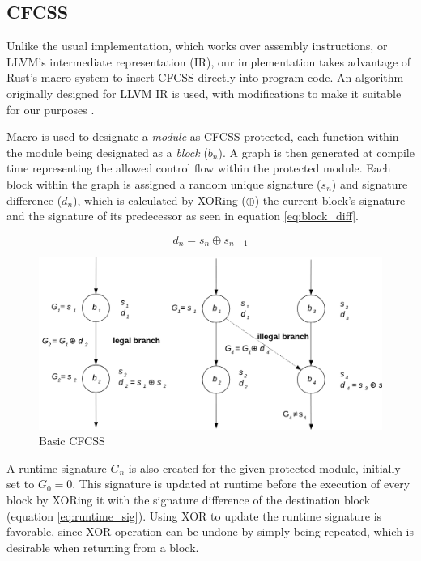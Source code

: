 \documentclass[12pt, letterpaper]{article}
\begin{document}
\clearpage

\subsection{CFCSS}

Unlike the usual implementation, which works over assembly instructions, or LLVM's intermediate representation (IR), our implementation takes advantage of Rust's macro system to insert CFCSS directly into program code. An algorithm originally designed for LLVM IR is used, with modifications to make it suitable for our purposes \cite{coast:cfcss}.

Macro is used to designate a \textit{module} as CFCSS protected, each function within the module being designated as a \textit{block} ({$b_n$}). A graph is then generated at compile time representing the allowed control flow within the protected module. Each block within the graph is assigned a random unique signature ({$s_n$}) and signature difference ({$d_n$}), which is calculated by XORing ({$\oplus$}) the current block's signature and the signature of its predecessor as seen in equation \ref{eq:block_diff}.

\begin{equation}
d_n = s_n \oplus s_{n-1}
\label{eq:block_diff}
\end{equation}

\begin{figure}[!h]
    \centering
    \includegraphics[width=1.0\textwidth]{diagrams/cfcss/basic.png}
    \caption{Basic CFCSS \cite{coast:cfcss}}
\end{figure}

A runtime signature {$G_n$} is also created for the given protected module, initially set to {$G_0 = 0$}. This signature is updated at runtime before the execution of every block by XORing it with the signature difference of the destination block (equation \ref{eq:runtime_sig}). Using XOR to update the runtime signature is favorable, since XOR operation can be undone by simply being repeated, which is desirable when returning from a block.
\end{document}
